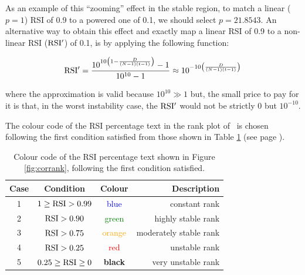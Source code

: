 As an example of this ``zooming'' effect in the stable region, to match a linear ($p=1$) RSI of 0.9 to a powered one of 0.1, we should select $p=21.8543$. An alternative way to obtain this effect and exactly map a linear RSI of 0.9 to a non-linear RSI (${\rm RSI'}$) of 0.1, is by applying the following function:
\begin{linenomath}
$${\rm RSI'} = \frac{10^{10\left(1-\frac{D}{(N-1)(t-1)}\right)}-1}{10^{10}-1} \approx 10^{-10\left(\frac{D}{(N-1)(t-1)}\right)}$$
\end{linenomath}
where the approximation is valid because $10^{10}\gg 1$ but, the small price to pay for it is that, in the worst instability case, the ${\rm RSI'}$ would not be strictly $0$ but $10^{-10}$.

The colour code of the RSI percentage text in the rank plot of \CC\ is chosen following the first condition satisfied from those shown in Table \ref{tab:RSI} (see page \pageref{tab:RSI}). 

\begin{table}
  \begin{center}
    \begin{tabular}{cccr}
    \hline
    Case  &  Condition  &  Colour  &  Description \\
    \hline
    1  &  $1\ge{\rm RSI}>0.99$  & \textcolor{blue}{blue} & constant rank \\ 
    2  & ${\rm RSI}>0.90$  &  \textcolor{green}{green}  & highly stable rank \\
    3  &  ${\rm RSI}>0.75$  &  \textcolor{orange}{orange} & moderately stable rank \\
    4  &  ${\rm RSI}>0.25$  &  \textcolor{red}{red} & unstable rank \\
    5  &  $0.25\ge{\rm RSI}\ge0$  &  \bfseries{black} & very unstable rank \\
    \hline
    \end{tabular}
  \end{center} 
  \caption{Colour code of the RSI percentage text shown in Figure \ref{fig:corrank}, following the first condition satisfied.}
  \label{tab:RSI}
\end{table}



